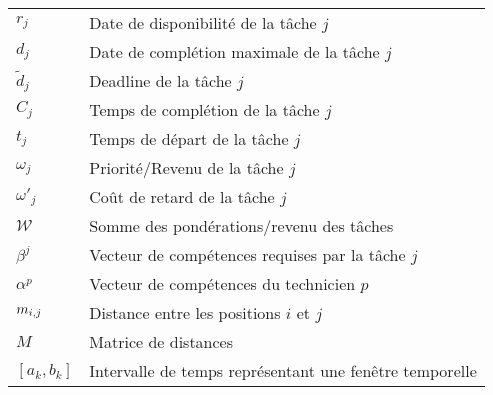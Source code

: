\begin{appendix}
\begin{table}[H]
\begin{tabular}{ll}
$r_j$ & Date de disponibilité de la tâche $j$ \\
$d_j$ &  Date de complétion maximale de la tâche $j$  \\
$ \tilde{d}_j $ & Deadline de la tâche $j$\\
$C_j$ & Temps de complétion de la tâche $j$ \\
$t_j$ & Temps de départ de la tâche $j$ \\
$\omega_j$ & Priorité/Revenu de la tâche $j$ \\
$\omega'_j$ & Coût de retard de la tâche $j$ \\
$\mathcal{W}$ & Somme des pondérations/revenu des tâches \\
$ \beta^j$ & Vecteur de compétences requises par la tâche $j$\\
$ \alpha^p$ & Vecteur de compétences du technicien $p$\\
$m_{i,j}$ & Distance entre les positions $i$ et $j$\\
$M$ & Matrice de distances\\
$\left[a_k,b_k\right] $ & Intervalle de temps représentant une fenêtre temporelle \\
\end{tabular}
\end{table}
\end{appendix}
